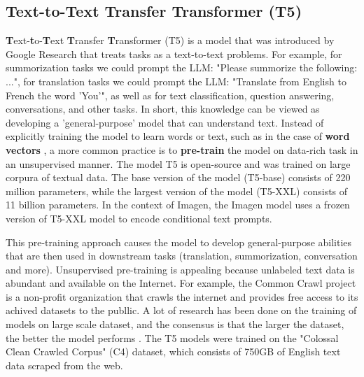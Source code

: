 \subsection{Text-to-Text Transfer Transformer (T5)}

\textbf{T}ext-\textbf{t}o-\textbf{T}ext \textbf{T}ransfer \textbf{T}ransformer (T5) \cite{t5_model} is a model that was introduced by Google Research that treats tasks as a text-to-text problems. For example, for summorization tasks we could prompt the LLM: "Please summorize the following: ...", for translation tasks we could prompt the LLM: "Translate from English to French the word 'You'", as well as for text classification, question answering, conversations, and other tasks. In short, this knowledge can be viewed as developing a 'general-purpose' model that can understand text.  Instead of explicitly training the model to learn words or text, such as in the case of \textbf{word vectors} \cite{cbow_word2vec}, a more common practice is to \textbf{pre-train} \cite{bert} the model on data-rich task in an unsupervised manner. The model T5 is open-source and was trained on large corpura of textual data. The base version of the model (T5-base) consists of 220 million parameters, while the largest version of the model (T5-XXL) consists of 11 billion parameters. In the context of Imagen, the Imagen model uses a frozen version of T5-XXL model to encode conditional text prompts.

This pre-training approach causes the model to develop general-purpose abilities that are then used in downstream tasks (translation, summorization, conversation and more). Unsupervised pre-training is appealing because unlabeled text data is abundant and available on the Internet. For example, the Common Crawl project \cite{common_crawl_project} is a non-profit organization that crawls the internet and provides free access to its achived datasets to the publlic. A lot of research has been done on the training of models on large scale dataset, and the consensus is that the larger the dataset, the better the model performs \cite{radford2019language} \cite{jozefowicz2016exploring} \cite{hestness2017deep}. The T5 models were trained on the "Colossal Clean Crawled Corpus" (C4) dataset, which consists of 750GB of English text data scraped from the web.

